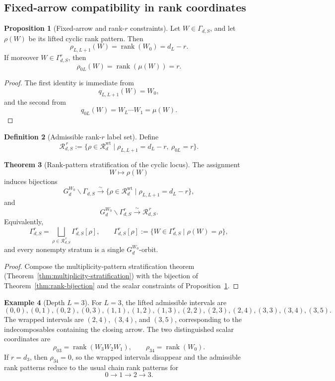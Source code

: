 \documentclass[11pt]{article}
\newcommand{\rk}{\operatorname{rank}}
\theoremstyle{definition}
\newtheorem{theorem}{Theorem}[section]
\newtheorem{proposition}[theorem]{Proposition}
\newtheorem{definition}[theorem]{Definition}
\newtheorem{example}[theorem]{Example}
\begin{document}
\subsection{Fixed-arrow compatibility in rank coordinates}

\begin{proposition}[Fixed-arrow and rank-\(r\) constraints]
\label{prop:rank-constraints}
Let \(W\in \Gamma_{d,S}\), and let \(\rho(W)\) be its lifted cyclic rank
pattern. Then
\[
\rho_{L,L+1}(W)=\rk(W_0)=d_L-r.
\]
If moreover \(W\in \Gamma_{d,S}^r\), then
\[
\rho_{0L}(W)=\rk(\mu(W))=r.
\]
\end{proposition}

\begin{proof}
The first identity is immediate from
\[
q_{L,L+1}(W)=W_0,
\]
and the second from
\[
q_{0L}(W)=W_L\cdots W_1=\mu(W).
\]
\end{proof}

\begin{definition}[Admissible rank-\(r\) label set]
Define
\[
\mathcal R_{d,S}^{\,r}
:=
\{\rho\in \mathcal R_d^{\mathrm{wt}}\mid \rho_{L,L+1}=d_L-r,\ \rho_{0L}=r\}.
\]
\end{definition}

\begin{theorem}[Rank-pattern stratification of the cyclic locus]
\label{thm:rank-strat-gamma}
The assignment
\[
W\longmapsto \rho(W)
\]
induces bijections
\[
G_d^{W_0}\backslash \Gamma_{d,S}
\xrightarrow{\sim}
\{\rho\in \mathcal R_d^{\mathrm{wt}}\mid \rho_{L,L+1}=d_L-r\},
\]
and
\[
G_d^{W_0}\backslash \Gamma_{d,S}^r
\xrightarrow{\sim}
\mathcal R_{d,S}^{\,r}.
\]
Equivalently,
\[
\Gamma_{d,S}^r
=
\bigsqcup_{\rho\in \mathcal R_{d,S}^{\,r}}
\Gamma_{d,S}^r[\rho],
\qquad
\Gamma_{d,S}^r[\rho]:=\{W\in \Gamma_{d,S}^r\mid \rho(W)=\rho\},
\]
and every nonempty stratum is a single \(G_d^{W_0}\)-orbit.
\end{theorem}

\begin{proof}
Compose the multiplicity-pattern stratification theorem
(Theorem~\ref{thm:multiplicity-stratification}) with the bijection of
Theorem~\ref{thm:rank-bijection} and the scalar constraints of
Proposition~\ref{prop:rank-constraints}.
\end{proof}

\begin{example}[Depth \(L=3\)]
For \(L=3\), the lifted admissible intervals are
\[
(0,0),(0,1),(0,2),(0,3),(1,1),(1,2),(1,3),(2,2),(2,3),(2,4),(3,3),(3,4),(3,5).
\]
The wrapped intervals are \((2,4)\), \((3,4)\), and \((3,5)\), corresponding to
the indecomposables containing the closing arrow. The two distinguished scalar
coordinates are
\[
\rho_{03}=\rk(W_3W_2W_1),
\qquad
\rho_{34}=\rk(W_0).
\]
If \(r=d_3\), then \(\rho_{34}=0\), so the wrapped intervals disappear and the
admissible rank patterns reduce to the usual chain rank patterns for
\[
0\to 1\to 2\to 3.
\]
\end{example}
\end{document}
